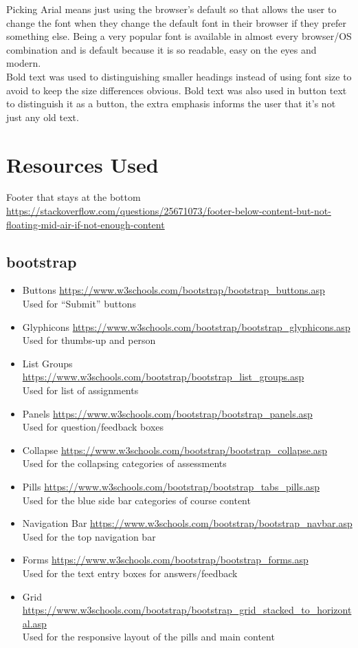 \documentclass[10pt,a4paper]{article}
\begin{document}
	Picking Arial means just using the browser's default so that allows the user to change the font when they change the default font in their browser if they prefer something else. Being a very popular font is available in almost every browser/OS combination and is default because it is so readable, easy on the eyes and modern. \\
	
	Bold text was used to distinguishing smaller headings instead of using font size to avoid to keep the size differences obvious. Bold text was also used in button text to distinguish it as a button, the extra emphasis informs the user that it's not just any old text.
	
	
\section{Resources Used}
	Footer that stays at the bottom\\ \url{https://stackoverflow.com/questions/25671073/footer-below-content-but-not-floating-mid-air-if-not-enough-content}
	\subsection*{bootstrap}
	\begin{itemize}
		\item Buttons \url{https://www.w3schools.com/bootstrap/bootstrap_buttons.asp}\\Used for ``Submit'' buttons
		\item Glyphicons \url{https://www.w3schools.com/bootstrap/bootstrap_glyphicons.asp}\\Used for thumbs-up and person
		\item List Groups \url{https://www.w3schools.com/bootstrap/bootstrap_list_groups.asp}\\Used for list of assignments
		\item Panels \url{https://www.w3schools.com/bootstrap/bootstrap_panels.asp}\\Used for question/feedback boxes
		\item Collapse \url{https://www.w3schools.com/bootstrap/bootstrap_collapse.asp}\\Used for the collapsing categories of assessments
		\item Pills \url{https://www.w3schools.com/bootstrap/bootstrap_tabs_pills.asp}\\Used for the blue side bar categories of course content
		\item Navigation Bar \url{https://www.w3schools.com/bootstrap/bootstrap_navbar.asp}\\Used for the top navigation bar
		\item Forms \url{https://www.w3schools.com/bootstrap/bootstrap_forms.asp}\\Used for the text entry boxes for answers/feedback
		\item Grid \url{https://www.w3schools.com/bootstrap/bootstrap_grid_stacked_to_horizontal.asp}\\	Used for the responsive layout of the pills and main content
	\end{itemize}
\end{document}
